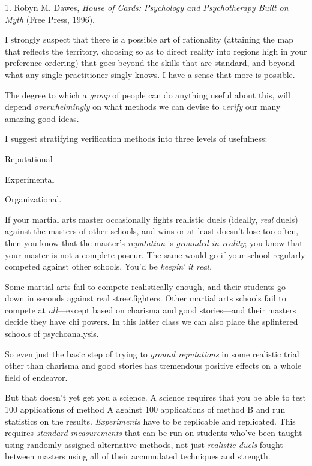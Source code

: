 \myendsectiontext


\bigskip

{
 1. Robyn M. Dawes, \textit{House of Cards: Psychology and
Psychotherapy Built on Myth} (Free Press, 1996).}


{
 I strongly suspect that there is a possible art of rationality
(attaining the map that reflects the territory, choosing so as to
direct reality into regions high in your preference ordering) that goes
beyond the skills that are standard, and beyond what any single
practitioner singly knows. I have a sense that more is possible. }

{
 The degree to which a \textit{group} of people can do anything
useful about this, will depend \textit{overwhelmingly} on what methods
we can devise to \textit{verify} our many amazing good ideas.}

{
 I suggest stratifying verification methods into three levels of
usefulness:}

{
 Reputational}

{
 Experimental}

{
 Organizational.}

{
 If your martial arts master occasionally fights realistic duels
(ideally, \textit{real} duels) against the masters of other schools,
and wins or at least doesn't lose too often, then you
know that the master's \textit{reputation} is
\textit{grounded in reality}; you know that your master is not a
complete poseur. The same would go if your school regularly competed
against other schools. You'd be
\textit{keepin' it real.}}

{
 Some martial arts fail to compete realistically enough, and their
students go down in seconds against real streetfighters. Other martial
arts schools fail to compete at \textit{all}{}---except based on
charisma and good stories---and their masters decide they have chi
powers. In this latter class we can also place the splintered schools
of psychoanalysis.}

{
 So even just the basic step of trying to \textit{ground
reputations} in some realistic trial other than charisma and good
stories has tremendous positive effects on a whole field of endeavor.}

{
 But that doesn't yet get you a science. A science
requires that you be able to test 100 applications of method A against
100 applications of method B and run statistics on the results.
\textit{Experiments} have to be replicable and replicated. This
requires \textit{standard measurements} that can be run on students
who've been taught using randomly-assigned alternative
methods, not just \textit{realistic duels} fought between masters using
all of their accumulated techniques and strength.}


